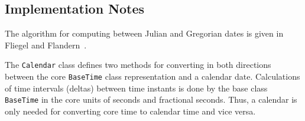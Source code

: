 
\subsection{Implementation Notes}

The algorithm for computing between Julian and Gregorian dates is given 
in Fliegel and Flandern~\cite{fliegel}.

The {\tt Calendar} class defines two methods for converting in both
directions between the core {\tt BaseTime} class representation and a
calendar date.  Calculations of time intervals (deltas) between
time instants is done by the base class {\tt BaseTime} in the core units
of seconds and fractional seconds.  Thus,  a calendar is only needed for
converting core time to calendar time and vice versa.
